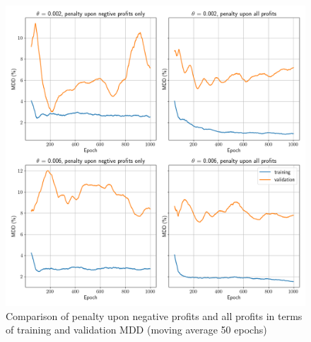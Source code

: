 \begin{figure}[ht]
  \includegraphics[width=15cm]{images/penalty_negtive_profits_compare.png}
  \caption [Comparison of penalty all profits and negative profits only] {Comparison of penalty upon negative profits and all profits in terms of training and validation MDD (moving average 50 epochs)}
  \label{fig:negtive_profits_diagram}
\end{figure}